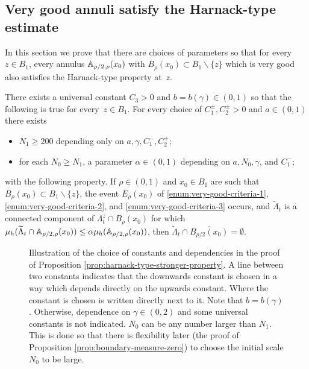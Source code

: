 \documentclass[12pt]{amsart}
\numberwithin{equation}{section}
\newcommand{\cluster}[2]{\hyperref[eq:non-co-set]{\mathit{\Lambda}^{#1}_{#2}}}
\begin{document}
	\subsection{Very good annuli satisfy the Harnack-type estimate} \label{subsec:very-good-annuli-satisfy-harnack-type-estimate}
	In this section we prove that there are choices of parameters so that for every~$z \in B_{1}$, every annulus $\mathbb{A}_{\rho/2, \rho}(x_0)$ with $\overline{B}_{\rho}(x_0) \subset B_1 \backslash \{z\}$  which is very good also satisfies the Harnack-type property at~$z$.
	\begin{lemma} \label{lemma:very-good-annuli-satisfy-harnack-type-estimate}
		There exists a universal constant $C_3 > 0$ and $b = b(\gamma) \in (0,1)$ so that the following is true
		for every~$z \in B_{1}$.  For every choice of $C_1^\pm , C_2^\pm  > 0$ and $a \in (0,1)$ there exists 
		\begin{itemize}
			\item $N_1 \geq 200$ depending only on $a,\gamma,C_1^-, C_2^+$;
			\item for each $N_0 \geq N_1$, a parameter $\alpha \in (0,1)$ depending on $a, N_0, \gamma$, and $C^-_1$;
		\end{itemize}
		with the following property. If $\rho \in (0,1)$ and $x_0 \in B_1$ are such that $\overline{B}_{\rho}(x_0) \subset B_1 \backslash \{z\}$,  the event $\overline E_\rho(x_0)$ of \ref{enum:very-good-criteria-1},
		\ref{enum:very-good-criteria-2}, and \ref{enum:very-good-criteria-3} occurs, and $\widetilde\Lambda_t$ is a connected component of ${\cluster{z}{t}} \cap B_{\rho}(x_0)$ 
		for which  $\mu_h(\widetilde \Lambda_t \cap \mathbb{A}_{\rho/2, \rho}(x_0)) \leq \alpha \mu_h(\mathbb{A}_{\rho/2, \rho}(x_0))$, then $\widetilde\Lambda_t \cap \overline{B_{\rho/2}(x_0)} = \emptyset$.
	\end{lemma}
	
	
	\begin{figure}
		\begin{center}
			
		\end{center}
		\caption{Illustration of the choice of constants and dependencies in the proof of Proposition \ref{prop:harnack-type-stronger-property}.
			A line between two constants indicates
			that the downwards constant is chosen in a way which depends directly on the upwards constant. Where the constant is chosen is written directly next to it. Note that $b = b(\gamma)$. Otherwise, dependence on $\gamma \in (0,2)$ and some universal constants is not indicated.  
			$N_0$ can be any number larger than $N_1$. This is done so that there is flexibility later (the proof of Proposition \ref{prop:boundary-measure-zero}) to choose the initial scale $N_0$ to be large.} \label{fig:constant-dependencies}
	\end{figure}
	
\end{document}
